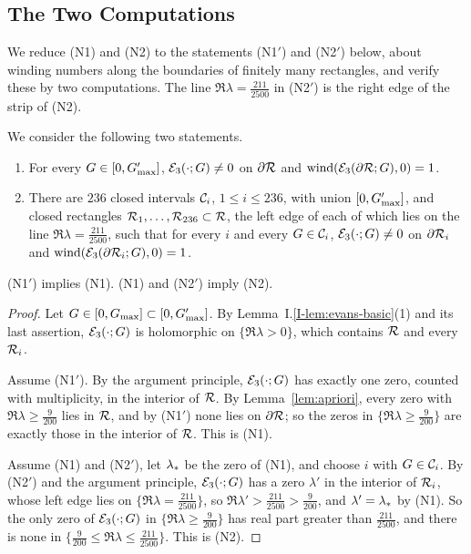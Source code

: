 \subsection{The Two Computations}
\label{app:runs}

We reduce \textup{(N1)} and \textup{(N2)} to the statements \textup{(N1$'$)} and
\textup{(N2$'$)} below, about winding numbers along the boundaries of finitely many
rectangles, and verify these by two computations. The line
$\Re\lambda=\frac{211}{2500}$ in \textup{(N2$'$)} is the right edge of the strip of
\textup{(N2)}.

\begin{definition}
\label{def:Nprime}
We consider the following two statements.
\begin{enumerate}[label=\textup{(N\arabic*$'$)}]
\item For every $G\in[0,G_{\max}']$, $\mathcal{E}_3(\cdot;G)\ne0$ on $\partial\mathcal{R}$ and
  $\operatorname{wind}(\mathcal{E}_3(\partial\mathcal{R};G),0)=1$.
\item There are $236$ closed intervals $\mathcal{C}_i$, $1\le i\le236$, with
  union $[0,G_{\max}']$, and closed rectangles
  $\mathcal{R}_1,\dots,\mathcal{R}_{236}\subset\mathcal{R}$, the left edge of
  each of which lies on the line $\Re\lambda=\frac{211}{2500}$, such that for
  every $i$ and every $G\in\mathcal{C}_i$, $\mathcal{E}_3(\cdot;G)\ne0$ on $\partial\mathcal{R}_i$
  and $\operatorname{wind}(\mathcal{E}_3(\partial\mathcal{R}_i;G),0)=1$.
\end{enumerate}
\end{definition}

\begin{lemma}
\label{lem:Nprime-N}
\textup{(N1$'$)} implies \textup{(N1)}. \textup{(N1)} and \textup{(N2$'$)} imply
\textup{(N2)}.
\end{lemma}
\begin{proof}
Let $G\in[0,G_{\max}]\subset[0,G_{\max}']$. By
Lemma~I.\ref{I-lem:evans-basic}\textup{(1)} and its last assertion, $\mathcal{E}_3(\cdot;G)$ is holomorphic on
$\{\Re\lambda>0\}$, which contains $\mathcal{R}$ and every $\mathcal{R}_i$.

Assume \textup{(N1$'$)}. By the argument principle, $\mathcal{E}_3(\cdot;G)$ has exactly
one zero, counted with multiplicity, in the interior of $\mathcal{R}$. By
Lemma~\ref{lem:apriori}, every zero with $\Re\lambda\ge\frac9{200}$
lies in $\mathcal{R}$, and by \textup{(N1$'$)} none lies on $\partial\mathcal{R}$; so the zeros in
$\{\Re\lambda\ge\frac9{200}\}$ are exactly those in the interior of $\mathcal{R}$. This is
\textup{(N1)}.

Assume \textup{(N1)} and \textup{(N2$'$)}, let $\lambda_*$ be the zero of
\textup{(N1)}, and choose $i$ with $G\in\mathcal{C}_i$. By \textup{(N2$'$)} and the argument
principle, $\mathcal{E}_3(\cdot;G)$ has a zero $\lambda'$ in the interior of $\mathcal{R}_i$, whose left edge
lies on $\{\Re\lambda=\frac{211}{2500}\}$, so $\Re\lambda'>\frac{211}{2500}>\frac9{200}$, and $\lambda'=\lambda_*$ by \textup{(N1)}.
So the only zero of $\mathcal{E}_3(\cdot;G)$ in $\{\Re\lambda\ge\frac9{200}\}$ has real
part greater than $\frac{211}{2500}$, and there is none in
$\{\frac9{200}\le\Re\lambda\le\frac{211}{2500}\}$. This is \textup{(N2)}.
\end{proof}

